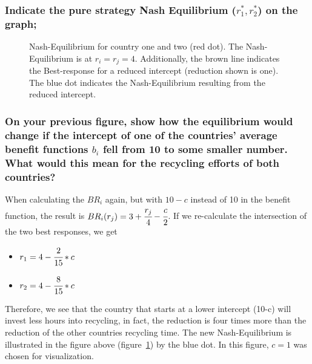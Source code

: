     \subsubsection{Indicate the pure strategy Nash Equilibrium ($r_1^*,r_2^*$) on the graph;}
    \begin{figure}[H]
        \centering
        \caption{Nash-Equilibrium for country one and two (red dot). The Nash-Equilibrium is at $r_i=r_j=4$. Additionally, the brown line
        indicates the Best-response for a reduced intercept (reduction shown is one). The blue dot
        indicates the Nash-Equilibrium resulting from the reduced intercept.
        }
        \label{fig:nash_br}
    \end{figure}

    \subsubsection{On your previous figure, show how the equilibrium would change if the intercept of one of the countries' average benefit functions $b_i$ fell from 10 to some smaller number. What would this mean for the recycling efforts of both countries?}
    When calculating the $BR_i$ again, but with $10-c$ instead of 10 in the benefit function, the result is
    $BR_i(r_j)=3+\cfrac{r_j}{4}-\cfrac{c}{2}$. If we re-calculate the intersection of the two best responses, we get
    \begin{itemize}
        \item $r_1=4-\cfrac{2}{15}*c$
        \item $r_2=4-\cfrac{8}{15}*c$
    \end{itemize}
    Therefore, we see that the country that starts at a lower intercept (10-c) will invest less
    hours into recycling, in fact, the reduction is four times more than the reduction of the other countries recycling time.
    The new Nash-Equilibrium is illustrated in the figure above (figure~\ref{fig:nash_br}) by the blue dot. In this
    figure, $c=1$ was chosen for visualization.

